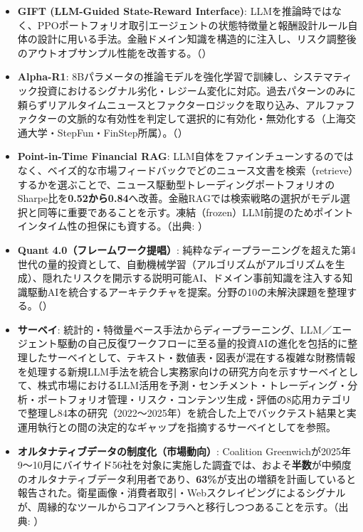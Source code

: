 \begin{itemize}
  \item \textbf{GIFT (LLM-Guided State-Reward Interface)}: LLMを推論時ではなく、PPOポートフォリオ取引エージェントの状態特徴量と報酬設計ルール自体の設計に用いる手法。金融ドメイン知識を構造的に注入し、リスク調整後のアウトオブサンプル性能を改善する。（\cite{gift2026}）
  \item \textbf{Alpha-R1}: 8Bパラメータの推論モデルを強化学習で訓練し、システマティック投資におけるシグナル劣化・レジーム変化に対応。過去パターンのみに頼らずリアルタイムニュースとファクターロジックを取り込み、アルファファクターの文脈的な有効性を判定して選択的に有効化・無効化する（上海交通大学・StepFun・FinStep所属）。（\cite{alphar1_2025}）
  \item \textbf{Point-in-Time Financial RAG}: LLM自体をファインチューンするのではなく、ベイズ的な市場フィードバックでどのニュース文書を検索（retrieve）するかを選ぶことで、ニュース駆動型トレーディングポートフォリオのSharpe比を\textbf{0.52から0.84}へ改善。金融RAGでは検索戦略の選択がモデル選択と同等に重要であることを示す。凍結（frozen）LLM前提のためポイントインタイム性の担保にも資する。（出典: \cite{pitrag2026}）
  \item \textbf{Quant 4.0（フレームワーク提唱）}: 純粋なディープラーニングを超えた第4世代の量的投資として、自動機械学習（アルゴリズムがアルゴリズムを生成）、隠れたリスクを開示する説明可能AI、ドメイン事前知識を注入する知識駆動AIを統合するアーキテクチャを提案。分野の10の未解決課題を整理する。（\cite{quant40_2023}）
  \item \textbf{サーベイ}: 統計的・特徴量ベース手法からディープラーニング、LLM／エージェント駆動の自己反復ワークフローに至る量的投資AIの進化を包括的に整理したサーベイとして\cite{quantsurvey2025}、テキスト・数値表・図表が混在する複雑な財務情報を処理する新規LLM手法を統合し実務家向けの研究方向を示すサーベイとして\cite{bridginglm2025}、株式市場におけるLLM活用を予測・センチメント・トレーディング・分析・ポートフォリオ管理・リスク・コンテンツ生成・評価の8応用カテゴリで整理し84本の研究（2022〜2025年）を統合した上でバックテスト結果と実運用執行との間の決定的なギャップを指摘するサーベイとして\cite{llmequitysurvey2025}を参照。
  \item \textbf{オルタナティブデータの制度化（市場動向）}: Coalition Greenwichが2025年9〜10月にバイサイド56社を対象に実施した調査では、およそ\textbf{半数}が中頻度のオルタナティブデータ利用者であり、\textbf{63\%}が支出の増額を計画していると報告された。衛星画像・消費者取引・Webスクレイピングによるシグナルが、周縁的なツールからコアインフラへと移行しつつあることを示す。（出典: \cite{altdata2025}）
\end{itemize}

